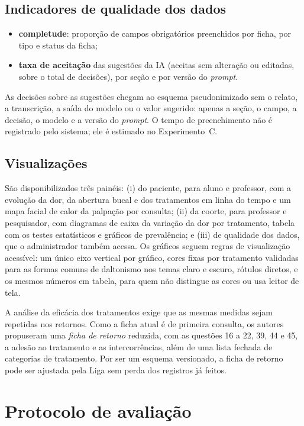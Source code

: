 \subsection{Indicadores de qualidade dos dados}

\begin{itemize}
	\item \textbf{completude}: proporção de campos obrigatórios preenchidos por ficha, por tipo e status da ficha;
	\item \textbf{taxa de aceitação} das sugestões da IA (aceitas sem alteração ou editadas, sobre o total de decisões), por seção e por versão do \textit{prompt}.
\end{itemize}

As decisões sobre as sugestões chegam ao esquema pseudonimizado sem o relato, a transcrição, a saída do modelo ou o valor sugerido: apenas a seção, o campo, a decisão, o modelo e a versão do \textit{prompt}. O tempo de preenchimento não é registrado pelo sistema; ele é estimado no Experimento~C.

\subsection{Visualizações}

São disponibilizados três painéis: (i) do paciente, para aluno e professor, com a evolução da dor, da abertura bucal e dos tratamentos em linha do tempo e um mapa facial de calor da palpação por consulta; (ii) da coorte, para professor e pesquisador, com diagramas de caixa da variação da dor por tratamento, tabela com os testes estatísticos e gráficos de prevalência; e (iii) de qualidade dos dados, que o administrador também acessa. Os gráficos seguem regras de visualização acessível: um único eixo vertical por gráfico, cores fixas por tratamento validadas para as formas comuns de daltonismo nos temas claro e escuro, rótulos diretos, e os mesmos números em tabela, para quem não distingue as cores ou usa leitor de tela.

A análise da eficácia dos tratamentos exige que as mesmas medidas sejam repetidas nos retornos. Como a ficha atual é de primeira consulta, os autores propuseram uma \emph{ficha de retorno} reduzida, com as questões 16 a 22, 39, 44 e 45, a adesão ao tratamento e as intercorrências, além de uma lista fechada de categorias de tratamento. Por ser um esquema versionado, a ficha de retorno pode ser ajustada pela Liga sem perda dos registros já feitos.

\section{Protocolo de avaliação}
\label{sec:protocolo}

